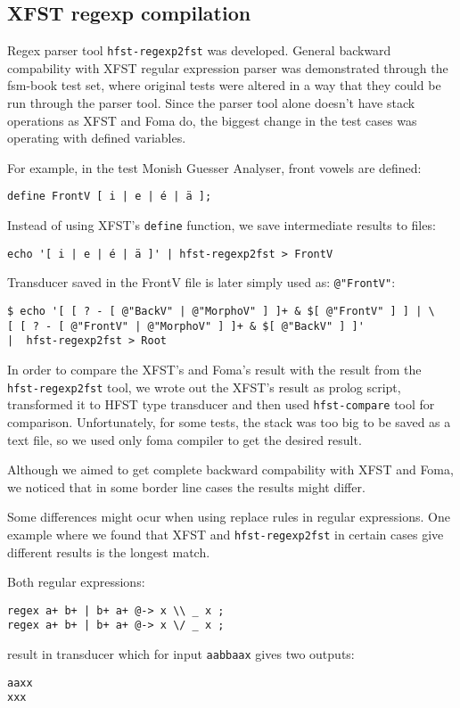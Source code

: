 \documentclass{llncs}
\begin{document}
\subsection{XFST regexp compilation}

Regex parser tool \verb+hfst-regexp2fst+ was developed. General backward
compability with XFST regular expression parser was demonstrated through the
fsm-book test set, where original tests were altered in a way that they could be
run through the parser tool. Since the parser tool alone doesn't have stack
operations as XFST and Foma do, the biggest change in the test cases was
operating with defined variables.

For example, in the test Monish Guesser Analyser, front vowels are defined:
\begin{verbatim}
define FrontV [ i | e | é | ä ];
\end{verbatim}  
Instead of using XFST's \verb+define+ function, we save intermediate results
to files:
\begin{verbatim}
echo '[ i | e | é | ä ]' | hfst-regexp2fst > FrontV
\end{verbatim}  
Transducer saved in the FrontV file is later simply used as: \verb+@"FrontV"+:
\begin{verbatim}
$ echo '[ [ ? - [ @"BackV" | @"MorphoV" ] ]+ & $[ @"FrontV" ] ] | \
[ [ ? - [ @"FrontV" | @"MorphoV" ] ]+ & $[ @"BackV" ] ]'
|  hfst-regexp2fst > Root
\end{verbatim}

In order to compare the XFST's and Foma's result with the result from the
\verb+hfst-regexp2fst+ tool, we wrote out the XFST's result as prolog script,
transformed it to HFST type transducer and then used \verb+hfst-compare+ tool
for comparison. Unfortunately, for some tests, the stack was too big to be saved
as a text file, so we used only foma compiler to get the desired result.

Although we aimed to get complete backward compability with XFST and Foma, we
noticed that in some border line cases the results might differ.

Some differences might ocur when using replace rules in regular expressions. One
example where we found that XFST and \verb+hfst-regexp2fst+ in certain cases
give different results is the longest match.

Both regular expressions: 
\begin{verbatim}
regex a+ b+ | b+ a+ @-> x \\ _ x ;
regex a+ b+ | b+ a+ @-> x \/ _ x ;
\end{verbatim}
result in transducer which for input \verb+aabbaax+ gives two outputs:
\begin{verbatim}
aaxx
xxx
\end{verbatim}
\end{document}
